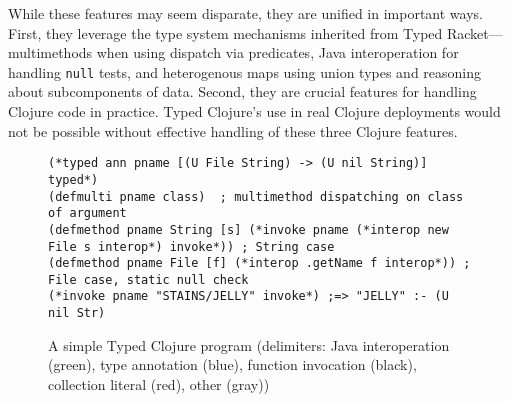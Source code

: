 While these features may seem disparate, they are unified in important
ways. First, they leverage the type system mechanisms
inherited from Typed Racket---multimethods when using 
dispatch via predicates, Java interoperation for handling
\texttt{null} tests, and heterogenous maps using union types and
reasoning about subcomponents of data. Second,
they are crucial features for handling Clojure code in
practice. Typed Clojure's use in real Clojure deployments would not be
possible without effective handling of these three Clojure features. 

\begin{figure*}[t!]
  \normalsize
\begin{lstlisting}
(*typed ann pname [(U File String) -> (U nil String)] typed*)
(defmulti pname class)  ; multimethod dispatching on class of argument
(defmethod pname String [s] (*invoke pname (*interop new File s interop*) invoke*)) ; String case 
(defmethod pname File [f] (*interop .getName f interop*)) ; File case, static null check
(*invoke pname "STAINS/JELLY" invoke*) ;=> "JELLY" :- (U nil Str)
\end{lstlisting}
\caption{A simple Typed Clojure program (delimiters: {\color{interop}Java interoperation (green)}, 
  {\color{types}type annotation (blue)},
  {\color{invoke}function invocation (black)}, {\color{red}collection literal (red)}, {\color{mygray}other (gray)})}
\label{fig:ex1}
\end{figure*}



